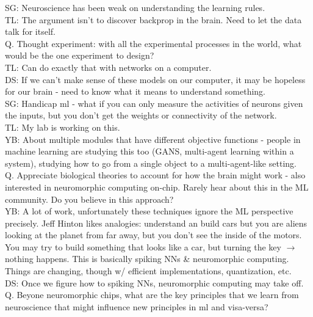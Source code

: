\documentclass[12pt]{article}
\begin{document}
SG: Neuroscience has been weak on understanding the learning rules. \\

TL: The argument isn't to discover backprop in the brain. Need to let the data talk for itself. \\

Q. Thought experiment: with all the experimental processes in the world, what would be the one experiment to design? \\

TL: Can do exactly that with networks on a computer. \\

DS: If we can't make sense of these models on our computer, it may be hopeless for our brain - need to know what it means to understand something. \\

SG: Handicap ml - what if you can only measure the activities of neurons given the inputs, but you don't get the weights or connectivity of the network. \\

TL: My lab is working on this. \\

YB: About multiple modules that have different objective functions - people in machine learning are studying this too (GANS, multi-agent learning within a system), studying how to go from a single object to a multi-agent-like setting. \\

Q. Appreciate biological theories to account for how the brain might work - also interested in neuromorphic computing on-chip. Rarely hear about this in the ML community. Do you believe in this approach? \\

YB: A lot of work, unfortunately these techniques ignore the ML perspective precisely. Jeff Hinton likes analogies: understand an build cars but you are aliens looking at the planet from far away, but you don't see the inside of the motors. You may try to build something that looks like a car, but turning the key $\rightarrow$ nothing happens. This is basically spiking NNs \& neuromorphic computing. Things are changing, though w/ efficient implementations, quantization, etc. \\

DS: Once we figure how to spiking NNs, neuromorphic computing may take off. \\

Q. Beyone neuromorphic chips, what are the key principles that we learn from neuroscience that might influence new principles in ml and visa-versa? \\
\end{document}
